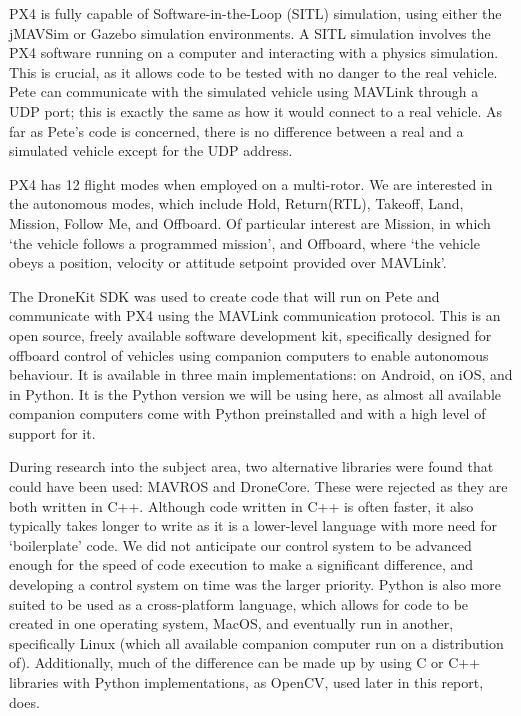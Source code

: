 \documentclass[11pt]{article}
\begin{document}
PX4 is fully capable of Software-in-the-Loop (SITL) simulation, using either the jMAVSim or Gazebo simulation environments\cite{PX4_dev_guide}. A SITL simulation involves the PX4 software running on a computer and interacting with a physics simulation. This is crucial, as it allows code to be tested with no danger to the real vehicle. Pete can communicate with the simulated vehicle using MAVLink through a UDP port; this is exactly the same as how it would connect to a real vehicle. As far as Pete's code is concerned, there is no difference between a real and a simulated vehicle except for the UDP address.


PX4 has 12 flight modes when employed on a multi-rotor. We are interested in the autonomous modes, which include Hold, Return(RTL), Takeoff, Land, Mission, Follow Me, and Offboard. Of particular interest are Mission, in which `the vehicle follows a programmed mission', and Offboard, where `the vehicle obeys a position, velocity or attitude setpoint provided over MAVLink'\cite{PX4_user_guide}.

The DroneKit SDK was used to create code that will run on Pete and communicate with PX4 using the MAVLink communication protocol. This is an open source, freely available software development kit, specifically designed for offboard control of vehicles using companion computers to enable autonomous behaviour. It is available in three main implementations: on Android, on iOS, and in Python. It is the Python version we will be using here, as almost all available companion computers come with Python preinstalled and with a high level of support for it.

During research into the subject area, two alternative libraries were found that could have been used: MAVROS and DroneCore. These were rejected as they are both written in C++. Although code written in C++ is often faster, it also typically takes longer to write as it is a lower-level language with more need for `boilerplate' code. We did not anticipate our control system to be advanced enough for the speed of code execution to make a significant difference, and developing a control system on time was the larger priority. Python is also more suited to be used as a cross-platform language, which allows for code to be created in one operating system, MacOS, and eventually run in another, specifically Linux (which all available companion computer run on a distribution of).
Additionally, much of the difference can be made up by using C or C++ libraries with Python implementations, as OpenCV, used later in this report, does.
\end{document}
